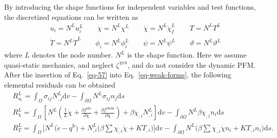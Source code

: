 \documentclass[reprint,3p,sort&compress,times,onecolumn]{elsarticle}
\begin{document}
By introducing the shape functions for independent variables and test functions, the discretized equations can be written as 
\begin{equation}
\begin{split}
& u_i = N^L u_i^L \quad\quad \chi = N^L \chi^L \quad\quad \dot{\chi}=N^L \dot{\chi}_I^L \quad\quad T=N^L T^L \\
&\dot{T}=N^L \dot{T}^L \quad\quad \phi_i = N^L \phi_i^L  \quad\quad \psi = N^L \psi^L \quad\quad \vartheta = N^L \vartheta^L   \label{eq-57}
\end{split}
\end{equation}
where $L$ denotes the node number. $N^L$ is the shape function. Here we assume quasi-static mechanics, and neglect $\zeta^{\chi\text{ex}}$, and do not consider the dynamic PFM. After the insertion of Eq.~\ref{eq-57} into Eq.~\ref{eq-weak-forms}, the following elemental residuals can be obtained
\begin{equation}
\begin{split}
& R_{u_i}^L = \int_\Omega \sigma_{ij} N_{,j}^L \text{d}v - \int_{\partial\Omega} N^L\sigma_{ij}n_j \text{d}s  \\
& R_{\chi}^L=\int_\Omega \left[N^L\left( \frac{1}L\dot{\chi}+\frac{\partial f^\text{ela}}{\partial \chi} +\frac{\partial f^\text{chem}}{\partial \chi} \right) + \beta \chi_{,i} N_{,i}^L \right]\text{d}v - \int_{\partial \Omega} N^L \beta \chi_{,i}n_i \text{d}s  \\
& R_T^L=\int_\Omega\Big[N^L\Big(\dot{e}-q^{\text{h}}\Big)+N_{,i}^L\Big(\beta\sum \chi_{,i}\dot{\chi} +K T_{,i} \Big)  \Big] \text{d}v - \int_{\partial\Omega} N^L \Big( \beta\sum \chi_{,i}\dot{\chi}n_i + K T_{,i}n_i \Big) \text{d}s.
\end{split}
\end{equation}\label{eq23}
\end{document}
